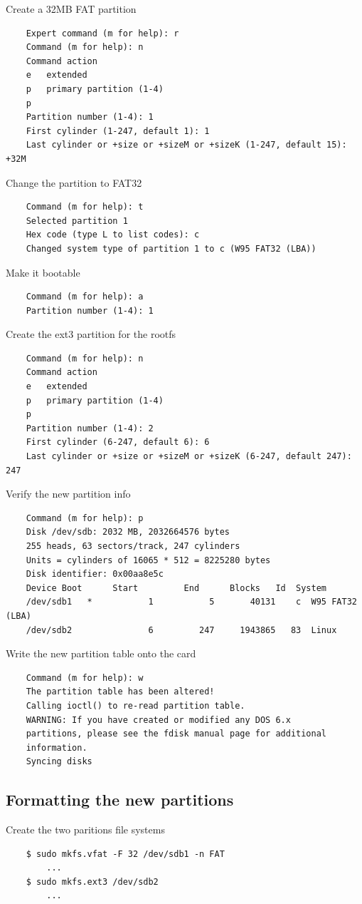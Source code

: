 \documentclass[11pt]{report} %
\begin{document}
		Create a 32MB FAT partition
\begin{lstlisting}
	Expert command (m for help): r
	Command (m for help): n
	Command action
	e   extended
	p   primary partition (1-4)
	p
	Partition number (1-4): 1
	First cylinder (1-247, default 1): 1
	Last cylinder or +size or +sizeM or +sizeK (1-247, default 15): +32M
\end{lstlisting}

		Change the partition to FAT32
\begin{lstlisting}
	Command (m for help): t
	Selected partition 1
	Hex code (type L to list codes): c
	Changed system type of partition 1 to c (W95 FAT32 (LBA))
\end{lstlisting}

		Make it bootable
\begin{lstlisting}
	Command (m for help): a
	Partition number (1-4): 1
\end{lstlisting}

		Create the ext3 partition for the rootfs
\begin{lstlisting}
	Command (m for help): n
	Command action
	e   extended
	p   primary partition (1-4)
	p
	Partition number (1-4): 2
	First cylinder (6-247, default 6): 6
	Last cylinder or +size or +sizeM or +sizeK (6-247, default 247): 247
\end{lstlisting}

		Verify the new partition info
\begin{lstlisting}
	Command (m for help): p
	Disk /dev/sdb: 2032 MB, 2032664576 bytes
	255 heads, 63 sectors/track, 247 cylinders
	Units = cylinders of 16065 * 512 = 8225280 bytes
	Disk identifier: 0x00aa8e5c
	Device Boot      Start         End      Blocks   Id  System
	/dev/sdb1   *           1           5       40131    c  W95 FAT32 (LBA)
	/dev/sdb2               6         247     1943865   83  Linux
\end{lstlisting}

		Write the new partition table onto the card
\begin{lstlisting}
	Command (m for help): w
	The partition table has been altered!
	Calling ioctl() to re-read partition table.
	WARNING: If you have created or modified any DOS 6.x
	partitions, please see the fdisk manual page for additional
	information.
	Syncing disks
\end{lstlisting}

	\subsection{Formatting the new partitions}
		Create the two paritions file systems
\begin{lstlisting}
	$ sudo mkfs.vfat -F 32 /dev/sdb1 -n FAT
		...
	$ sudo mkfs.ext3 /dev/sdb2
		...
\end{lstlisting}
\end{document}
